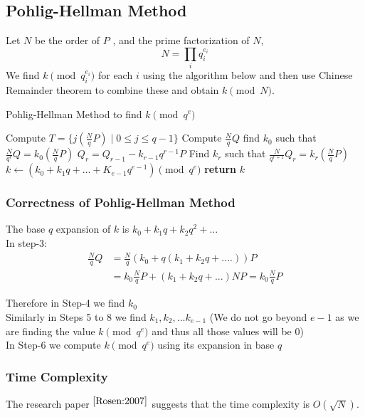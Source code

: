 \subsection{Pohlig-Hellman Method}
Let $N$ be the order of $P$ , and the prime factorization of $N$,
\[N = \prod_{i}q_{i}^{e_i}\]
We find $k\pmod{q_i^{e_i}}$ for each $i$ using the algorithm below and then use Chinese Remainder theorem to combine these and obtain $k\pmod N$.
\begin{algorithm}
\caption{Pohlig-Hellman Method to find $k \pmod {q^e}$}\label{PH}
\begin{algorithmic}[1]
\State Compute $T = \{j(\frac{N}{q}P) \mid 0\leq j \leq q-1\}$
\State Compute $\frac{N}{q}Q$
\State find $k_0$ such that  $\frac{N}{q^{r}}Q = k_0(\frac{N}{q}P)$
\State $Q_r = Q_{r-1} - k_{r-1}q^{r-1}P$
\State Find $k_r$ such that $\frac{N}{q^{r+1}}Q_r = k_r(\frac{N}{q}P)$
\EndFor
\State $k \gets (k_0 + k_1q + ... + K_{e-1}q^{e-1}) \pmod{q^e}$
\State \textbf{return} $k$
\EndProcedure
\end{algorithmic}
\end{algorithm}
\subsubsection{Correctness of Pohlig-Hellman Method}
The base $q$ expansion of $k$ is $k_0 + k_1q + k_2q^2 + ...$ \\
In step-3:
\begin{align*}
    \frac{N}{q}Q &= \frac{N}{q}(k_0 + q(k_1 + k_2q + ....))P\\
                 &= k_0\frac{N}{q}P + (k_1 + k_2q+...)NP = k_0\frac{N}{q}P
\end{align*}

\noindent Therefore in Step-4 we find $k_0$\\
Similarly in Steps 5 to 8 we find $k_1, k_2,...k_{e-1}$ (We do not go beyond $e-1$ as we are finding the value $k \pmod{q^e}$ and thus all those values will be 0)\\
In Step-6 we compute $k \pmod{q^e}$ using its expansion in base $q$
\subsubsection{Time Complexity}
The research paper $^{\cite{Rosen:2007}}$ suggests that the time complexity is  $O(\sqrt{N})$. 